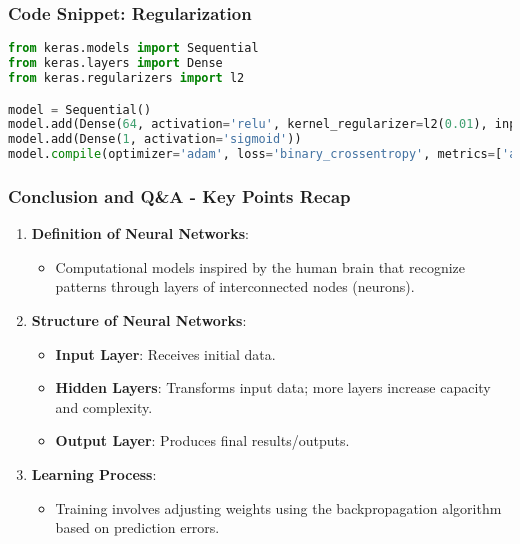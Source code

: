 \documentclass[aspectratio=169]{beamer}
\begin{document}
\begin{frame}[fragile]
    \frametitle{Code Snippet: Regularization}
    \begin{lstlisting}[language=Python]
from keras.models import Sequential
from keras.layers import Dense
from keras.regularizers import l2

model = Sequential()
model.add(Dense(64, activation='relu', kernel_regularizer=l2(0.01), input_dim=input_shape))
model.add(Dense(1, activation='sigmoid'))
model.compile(optimizer='adam', loss='binary_crossentropy', metrics=['accuracy'])
    \end{lstlisting}
\end{frame}

\begin{frame}[fragile]
    \frametitle{Conclusion and Q\&A - Key Points Recap}
    \begin{enumerate}
        \item \textbf{Definition of Neural Networks}:
        \begin{itemize}
            \item Computational models inspired by the human brain that recognize patterns through layers of interconnected nodes (neurons).
        \end{itemize}
        
        \item \textbf{Structure of Neural Networks}:
        \begin{itemize}
            \item \textbf{Input Layer}: Receives initial data.
            \item \textbf{Hidden Layers}: Transforms input data; more layers increase capacity and complexity.
            \item \textbf{Output Layer}: Produces final results/outputs.
        \end{itemize}
        
        \item \textbf{Learning Process}:
        \begin{itemize}
            \item Training involves adjusting weights using the backpropagation algorithm based on prediction errors.
        \end{itemize}
    \end{enumerate}
\end{frame}
\end{document}
